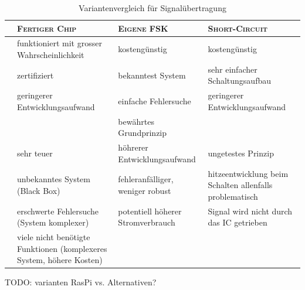 \begin{table}[h!]
    \centering
    \small
    \caption{Variantenvergleich f\"ur Signal\"ubertragung}
    \label{tab:signalvariants}
    \begin{tabular}{
        >{\raggedright}p{6mm}|
        >{\raggedright}p{40mm}
        >{\raggedright}p{40mm}
        >{\raggedright\arraybackslash}p{40mm}}

        \toprule
        & \textsc{Fertiger Chip}
        & \textsc{Eigene FSK}
        & \textsc{Short-Circuit}
        \\
        \midrule
        & funktioniert mit grosser Wahrscheinlichkeit
        & kosteng\"unstig
        & kosteng\"unstig
        \\

        \rowcolor{black!10}
        \cellcolor{white}
        & zertifiziert
        & bekanntest System
        & sehr einfacher Schaltungsaufbau
        \\

        & geringerer Entwicklungsaufwand
        & einfache Fehlersuche
        & geringerer Entwicklungsaufwand
        \\


        \rowcolor{black!10}
        \parbox[t]{1em}{}
        &
        & bew\"ahrtes Grundprinzip
        &
        \\

        \midrule
        & sehr teuer
        & h\"ohrerer Entwicklungsaufwand
        & ungetestes Prinzip
        \\

        & unbekanntes System (Black Box)
        & fehleranf\"alliger, weniger robust
        & hitzeentwicklung beim Schalten allenfalls problematisch
        \\

        & erschwerte Fehlersuche (System komplexer)
        & potentiell h\"oherer Stromverbrauch
        & Signal wird nicht durch das IC getrieben
        \\


        \parbox[t]{1em}{}
        & viele nicht ben\"otigte Funktionen (komplexeres System, h\"ohere Kosten)
        &
        &
        \\

        \bottomrule
    \end{tabular}
\end{table}

\textsc{TODO}: varianten RasPi vs. Alternativen?


